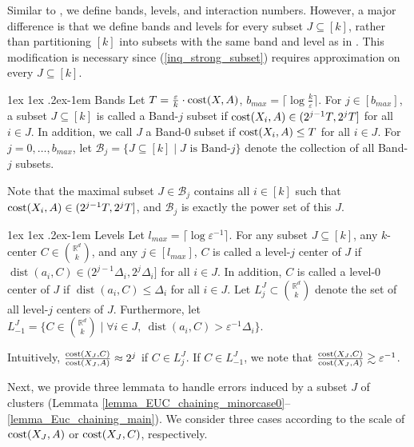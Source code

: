 \documentclass[11pt,letterpaper]{article}
\makeatletter
\renewcommand{\paragraph}{%
  \@startsection{paragraph}{4}%
  {\z@}{1ex \@plus 1ex \@minus .2ex}{-1em}%
  {\normalfont\normalsize\bfseries}%
}
\theoremstyle{definition}
\newcommand{\eps}{\varepsilon}
\DeclareMathOperator{\dist}{dist}
\makeatother
\begin{document}
Similar to \cite{bansal2024sensitivity}, we define bands, levels, and interaction numbers. However, a major difference is that we define bands and levels for every subset $J\subseteq [k]$, rather than partitioning $[k]$ into subsets with the same band and level as in \cite{bansal2024sensitivity}. This modification is necessary since (\ref{inq_strong_subset}) requires approximation on every $J\subseteq[k]$.

\paragraph{Bands}
Let $T=\frac{\eps}{k}\cdot \cost(X,A)$, $b_{max}=\lceil\log \frac{k}{\eps}\rceil$. For $j\in [b_{max}]$, a subset $J\subseteq [k]$ is called a Band-$j$ subset if $\cost(X_i,A)\in (2^{j-1}T,2^jT]$ for all $i\in J$. In addition, we call $J$ a Band-$0$ subset if $\cost(X_i,A)\leq T$ for all $i\in J$. For $j=0,\dots,b_{max}$, let $\mathcal{B}_j=\{J\subseteq [k]\mid J\text{ is Band-}j\}$ denote the collection of all Band-$j$ subsets.
%

Note that the maximal subset $J\in \mathcal{B}_j$ contains all $i\in [k]$ such that $\cost(X_i,A)\in (2^{j-1}T,2^jT]$, and $\mathcal{B}_j$ is exactly the power set of this $J$.

\paragraph{Levels} Let $l_{max}=\lceil\log \eps^{-1} \rceil$.
For any subset $J\subseteq[k]$, any $k$-center $C\in \binom{\mathbb{R}^d}{k}$, and any $j\in [l_{max}]$, $C$ is called a level-$j$ center of $J$ if $\dist(a_i,C)\in (2^{j-1}\Delta_i,2^j \Delta_i]$ for all $i\in J$. 
In addition, $C$ is called a level-$0$ center of $J$ if $\dist(a_i,C)\leq \Delta_i$ for all $i\in J$. Let $L^J_j\subset \binom{\mathbb{R}^d}{k}$ denote the set of all level-$j$ centers of $J$. Furthermore, let $L^{J}_{-1}=\{C\in \binom{\mathbb{R}^d}{k}\mid \forall i\in J,\ \dist(a_i,C)>\eps^{-1} \Delta_i\}$.

Intuitively, $\frac{\cost(X_J, C)}{\cost(X_J, A)} \approx 2^j$ if $C\in L_j^J$.
%
If $C\in L_{-1}^J$, we note that $\frac{\cost(X_J, C)}{\cost(X_J, A)} \gtrsim \eps^{-1}$.

Next, we provide three lemmata to handle errors induced by a subset $J$ of clusters (Lemmata \ref{lemma_EUC_chaining_minorcase0}--\ref{lemma_Euc_chaining_main}).
%
We consider three cases according to the scale of $\cost(X_J, A)$ or $\cost(X_J, C)$, respectively.
\end{document}

